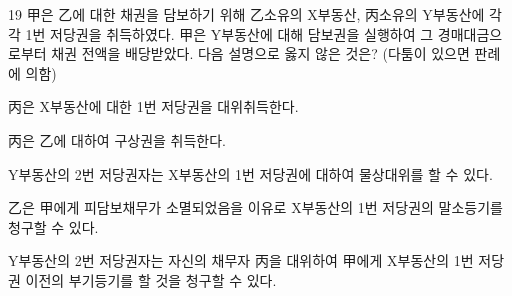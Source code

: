 \begin{question}{19}
甲은 乙에 대한 채권을 담보하기 위해 乙소유의 X부동산, 丙소유의 Y부동산에 각각 1번 저당권을 취득하였다. 甲은 Y부동산에 대해 담보권을 실행하여 그 경매대금으로부터 채권 전액을 배당받았다. 다음 설명으로 옳지 않은 것은? (다툼이 있으면 판례에 의함)
\begin{choices}
  \item 丙은 X부동산에 대한 1번 저당권을 대위취득한다.
  \item 丙은 乙에 대하여 구상권을 취득한다.
  \item Y부동산의 2번 저당권자는 X부동산의 1번 저당권에 대하여 물상대위를 할 수 있다.
  \item 乙은 甲에게 피담보채무가 소멸되었음을 이유로 X부동산의 1번 저당권의 말소등기를 청구할 수 있다.
  \item Y부동산의 2번 저당권자는 자신의 채무자 丙을 대위하여 甲에게 X부동산의 1번 저당권 이전의 부기등기를 할 것을 청구할 수 있다.
\end{choices}
\end{question}
